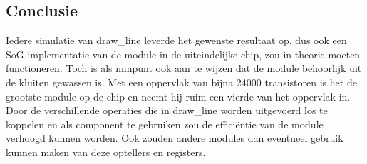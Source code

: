\documentclass{scrartcl} %
\begin{document}
\subsection{Conclusie}
Iedere simulatie van draw\_line leverde het gewenste resultaat op, dus ook een SoG-implementatie van de module in de uiteindelijke chip, zou in theorie moeten functioneren. Toch is als minpunt ook aan te wijzen dat de module behoorlijk uit de kluiten gewassen is. Met een oppervlak van bijna 24000 transistoren is het de grootste module op de chip en neemt hij ruim een vierde van het oppervlak in. Door de verschillende operaties die in draw\_line worden uitgevoerd los te koppelen en als component te gebruiken zou de efficiëntie van de module verhoogd kunnen worden. Ook zouden andere modules dan eventueel gebruik kunnen maken van deze optellers en registers.
\end{document}
